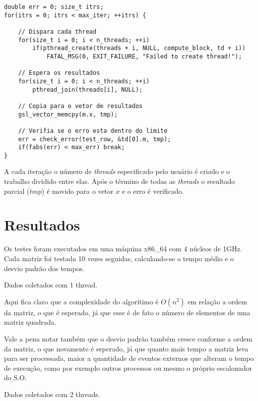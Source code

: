 \documentclass[11pt,towside]{article}
\begin{document}
\begin{lstlisting}
double err = 0; size_t itrs;
for(itrs = 0; itrs < max_iter; ++itrs) {

    // Dispara cada thread
    for(size_t i = 0; i < n_threads; ++i)
        if(pthread_create(threads + i, NULL, compute_block, td + i))
            FATAL_MSG(0, EXIT_FAILURE, "Failed to create thread!");

    // Espera os resultados
    for(size_t i = 0; i < n_threads; ++i)
        pthread_join(threads[i], NULL);

    // Copia para o vetor de resultados
    gsl_vector_memcpy(m.x, tmp);

    // Verifia se o erro esta dentro do limite
    err = check_error(test_row, &td[0].m, tmp);
    if(fabs(err) < max_err) break;
}
\end{lstlisting}

A cada iteração o número de \emph{threads} especificado pelo usuário é criado e o trabalho dividido entre elas. Após o término de todas as \emph{threads} o resultado parcial ($tmp$) é movido para o vetor $x$ e o erro é verificado.

\section{Resultados}
Os testes foram executados em uma máquina x86\_64 com 4 núcleos de 1GHz. Cada matriz foi testada 10 vezes seguidas, calculando-se o tempo médio e o desvio padrão dos tempos.

\begin{table}[h!]\centering
	\caption{Dados coletados com 1 thread.}
\end{table}

Aqui fica claro que a complexidade do algorítimo é $O(n^2)$ em relação a ordem da matriz, o que é esperado, já que esse é de fato o número de elementos de uma matriz quadrada.

Vale a pena notar também que o desvio padrão também cresce conforme a ordem da matriz, o que novamente é esperado, já que quanto mais tempo a matriz leva para ser processada, maior a quantidade de eventos externos que alteram o tempo de execução, como por exemplo outros processos ou mesmo o próprio escalonador do S.O.

\begin{table}[h!]\centering
	\caption{Dados coletados com 2 threads.}
\end{table}
\end{document}
